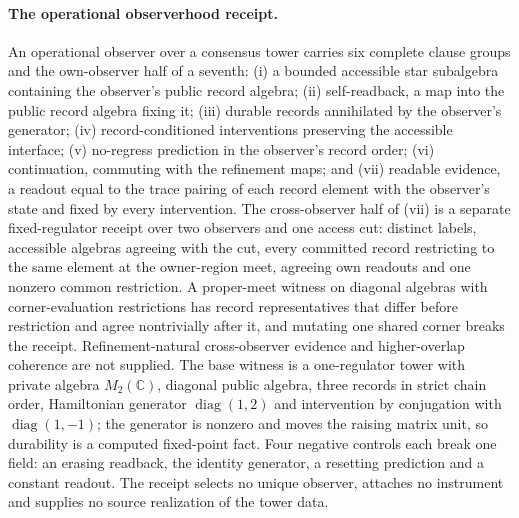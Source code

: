 \documentclass[11pt]{article}
\theoremstyle{remark}
\theoremstyle{plain}
\begin{document}
\paragraph{The operational observerhood receipt.}
An operational observer over a consensus tower carries six complete clause
groups and the own-observer half of a seventh: (i) a bounded accessible
star subalgebra containing the observer's public record algebra;
(ii) self-readback, a map into the public record algebra fixing it;
(iii) durable records annihilated by the observer's generator;
(iv) record-conditioned interventions preserving the accessible interface;
(v) no-regress prediction in the observer's record order;
(vi) continuation, commuting with the refinement maps; and (vii) readable
evidence, a readout equal to the trace pairing of each record element with
the observer's state and fixed by every intervention. The cross-observer
half of (vii) is a separate fixed-regulator receipt over two observers and
one access cut: distinct labels, accessible algebras agreeing with the cut,
every committed record restricting to the same element at the owner-region
meet, agreeing own readouts and one nonzero common restriction. A
proper-meet witness on diagonal algebras with corner-evaluation
restrictions has record representatives that differ before restriction and
agree nontrivially after it, and mutating one shared corner breaks the
receipt. Refinement-natural cross-observer evidence and higher-overlap
coherence are not supplied. The base witness is a one-regulator tower with
private algebra \(M_2(\mathbb C)\), diagonal public algebra, three records
in strict chain order, Hamiltonian generator \(\operatorname{diag}(1,2)\)
and intervention by conjugation with \(\operatorname{diag}(1,-1)\); the
generator is nonzero and moves the raising matrix unit, so durability is a
computed fixed-point fact. Four negative controls each break one field: an
erasing readback, the identity generator, a resetting prediction and a
constant readout. The receipt selects no unique observer, attaches no
instrument and supplies no source realization of the tower data.
\end{document}
